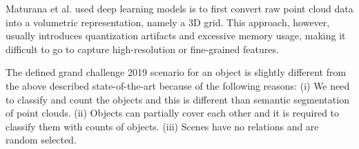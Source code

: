 Maturana et al. \cite{DBLP:conf/iros/MaturanaS15} used deep learning models is to first convert raw point cloud data into a 
volumetric representation, namely a 3D grid. This approach, however, usually introduces quantization artifacts and excessive memory usage, making it difficult to go to capture high-resolution or fine-grained features.


The defined grand challenge 2019 \cite{DEBSGC2019} scenario for an object is slightly different from
the above described state-of-the-art because of the following reasons: (i) We need to classify and
count the objects and this is different than semantic segmentation of point clouds. (ii) Objects
can partially cover each other and it is required to classify them with counts of objects.   
(iii) Scenes have no relations and are random selected. 










